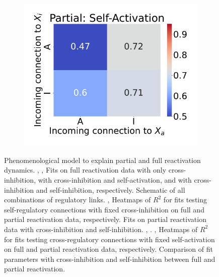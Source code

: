 \documentclass[11pt,a4paper]{article}
\begin{document}
\begin{figure}
\begin{subfigure}[c]{0.28\textwidth}
        \includegraphics[width=\textwidth]{vary_cross-AA-Partial_timeshifted-rsq-hmap}
        \caption{}
        \label{rsq-cross-a-part}
    \end{subfigure}
    \captionsetup{subrefformat=parens}
    \caption{Phenomenological model to explain partial and full reactivation dynamics. , ,  Fits on full reactivation data with only cross-inhibition, with cross-inhibition and self-activation, and with cross-inhibition and self-inhibition, respectively.  Schematic of all combinations of regulatory links. ,  Heatmaps of $R^2$ for fits testing self-regulatory connections with fixed cross-inhibition on full and partial reactivation data, respectively.  Fits on partial reactivation data with cross-inhibition and self-inhibition. , . ,   Heatmaps of $R^2$ for fits testing cross-regulatory connections with fixed self-activation on full and partial reactivation data, respectively.  Comparison of fit parameters with cross-inhibition and self-inhibition between full and partial reactivation.}
\end{figure}

\appendix
\end{document}
